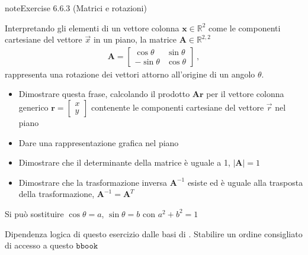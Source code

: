 \documentclass[letterpaper,10pt,italian]{jupyterBook}
\begin{document}
\begin{sphinxadmonition}{note}{Exercise 6.6.3 (Matrici e rotazioni)}



\sphinxAtStartPar
Interpretando gli elementi di un vettore colonna \(\mathbf{x} \in \mathbb{R}^2\) come le componenti cartesiane del vettore \(\vec{x}\) in un piano, la matrice \(\mathbf{A} \in \mathbb{R}^{2,2}\)
\begin{equation*}
\begin{split}\mathbf{A} = \begin{bmatrix} \cos\theta & \sin \theta \\ -\sin\theta & \cos\theta \end{bmatrix} \ ,\end{split}
\end{equation*}
\sphinxAtStartPar
rappresenta una rotazione dei vettori attorno all’origine di un angolo \(\theta\).


\begin{itemize}
\item {} 
\sphinxAtStartPar
Dimostrare questa frase, calcolando il prodotto \(\mathbf{A} \mathbf{r}\) per il vettore colonna generico \(\mathbf{r} = \begin{bmatrix} x \\ y \end{bmatrix}\) contenente le componenti cartesiane del vettore \(\vec{r}\) nel piano

\item {} 
\sphinxAtStartPar
Dare una rappresentazione grafica nel piano

\item {} 
\sphinxAtStartPar
Dimostrare che il determinante della matrice è uguale a 1, \(|\mathbf{A}| = 1\)

\item {} 
\sphinxAtStartPar
Dimostrare che la trasformazione inversa \(\mathbf{A}^{-1}\) esiste ed è uguale alla trasposta della trasformazione, \(\mathbf{A}^{-1} = \mathbf{A}^T\)

\end{itemize}

\sphinxAtStartPar
{} Si può sostituire \(\cos \theta = a\), \(\sin \theta = b\) con \(a^2 + b^2 = 1\)

\sphinxAtStartPar
{} Dipendenza logica di questo esercizio dalle basi di {\hyperref[\detokenize{ch/trigonometry:math-hs-trigonometry}]{}}. Stabilire un ordine consigliato di accesso a questo \(\texttt{bbook}\)
\end{sphinxadmonition}
 \label{exercise:ch/algebra/linear-algebra-exercise-10}
\end{document}
